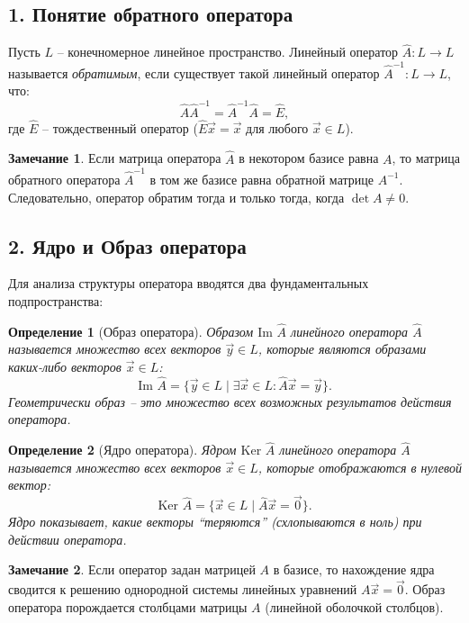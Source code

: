 \documentclass[12pt,a4paper]{article}
\theoremstyle{plain}
\newtheorem{definition}{Определение}[section]
\theoremstyle{definition}
\newtheorem{remark}{Замечание}[section]
\begin{document}
\begin{theorybox}
    \subsection*{1. Понятие обратного оператора}
    Пусть $L$ -- конечномерное линейное пространство. Линейный оператор $\hat{A}: L \to L$ называется \textit{обратимым}, если существует такой линейный оператор $\hat{A}^{-1}: L \to L$, что:
    \[
    \hat{A}\hat{A}^{-1} = \hat{A}^{-1}\hat{A} = \hat{E},
    \]
    где $\hat{E}$ -- тождественный оператор ($\hat{E}\vec{x} = \vec{x}$ для любого $\vec{x} \in L$).

    \begin{remark}
        Если матрица оператора $\hat{A}$ в некотором базисе равна $A$, то матрица обратного оператора $\hat{A}^{-1}$ в том же базисе равна обратной матрице $A^{-1}$. Следовательно, оператор обратим тогда и только тогда, когда $\det A \neq 0$.
    \end{remark}

    \subsection*{2. Ядро и Образ оператора}
    Для анализа структуры оператора вводятся два фундаментальных подпространства:

    \begin{definition}[Образ оператора]
        \textit{Образом} $\text{Im } \hat{A}$ линейного оператора $\hat{A}$ называется множество всех векторов $\vec{y} \in L$, которые являются образами каких-либо векторов $\vec{x} \in L$:
        \[
        \text{Im } \hat{A} = \{ \vec{y} \in L \mid \exists \vec{x} \in L : \hat{A}\vec{x} = \vec{y} \}.
        \]
        Геометрически образ -- это множество всех возможных результатов действия оператора.
    \end{definition}

    \begin{definition}[Ядро оператора]
        \textit{Ядром} $\text{Ker } \hat{A}$ линейного оператора $\hat{A}$ называется множество всех векторов $\vec{x} \in L$, которые отображаются в нулевой вектор:
        \[
        \text{Ker } \hat{A} = \{ \vec{x} \in L \mid \hat{A}\vec{x} = \vec{0} \}.
        \]
        Ядро показывает, какие векторы ``теряются'' (схлопываются в ноль) при действии оператора.
    \end{definition}

    \begin{remark}
        Если оператор задан матрицей $A$ в базисе, то нахождение ядра сводится к решению однородной системы линейных уравнений $A\vec{x} = \vec{0}$. Образ оператора порождается столбцами матрицы $A$ (линейной оболочкой столбцов).
    \end{remark}


\end{theorybox}
\end{document}
